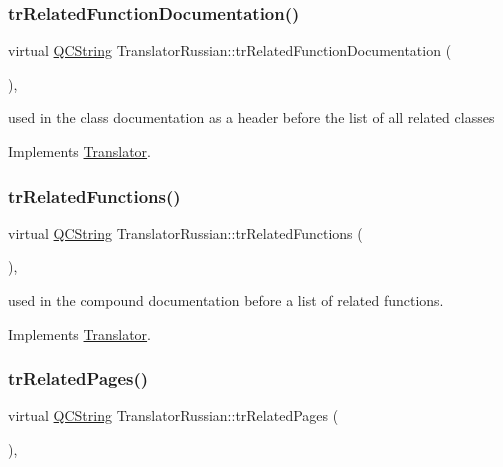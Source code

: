 \subsubsection{\texorpdfstring{trRelatedFunctionDocumentation()}{trRelatedFunctionDocumentation()}}
{\footnotesize\ttfamily virtual \mbox{\hyperlink{class_q_c_string}{Q\+C\+String}} Translator\+Russian\+::tr\+Related\+Function\+Documentation (\begin{DoxyParamCaption}{ }\end{DoxyParamCaption})\hspace{0.3cm}{\ttfamily [inline]}, {\ttfamily [virtual]}}

used in the class documentation as a header before the list of all related classes 

Implements \mbox{\hyperlink{class_translator}{Translator}}.

\mbox{\label{class_translator_russian_aacf7eca0cef6cc31318037d12cf927f7}} 
\subsubsection{\texorpdfstring{trRelatedFunctions()}{trRelatedFunctions()}}
{\footnotesize\ttfamily virtual \mbox{\hyperlink{class_q_c_string}{Q\+C\+String}} Translator\+Russian\+::tr\+Related\+Functions (\begin{DoxyParamCaption}{ }\end{DoxyParamCaption})\hspace{0.3cm}{\ttfamily [inline]}, {\ttfamily [virtual]}}

used in the compound documentation before a list of related functions. 

Implements \mbox{\hyperlink{class_translator}{Translator}}.

\mbox{\label{class_translator_russian_aefe14daea5713f12ef639dbe9d7379db}} 
\subsubsection{\texorpdfstring{trRelatedPages()}{trRelatedPages()}}
{\footnotesize\ttfamily virtual \mbox{\hyperlink{class_q_c_string}{Q\+C\+String}} Translator\+Russian\+::tr\+Related\+Pages (\begin{DoxyParamCaption}{ }\end{DoxyParamCaption})\hspace{0.3cm}{\ttfamily [inline]}, {\ttfamily [virtual]}}

